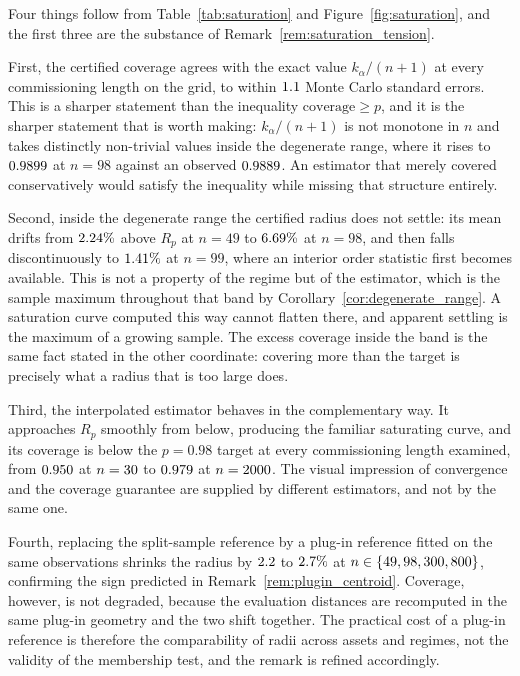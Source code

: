\documentclass[a4paper]{cas-sc}
\begin{document}
Four things follow from Table~\ref{tab:saturation} and
Figure~\ref{fig:saturation}, and the first three are the substance of
Remark~\ref{rem:saturation_tension}.

First, the certified coverage agrees with the exact value
\(k_\alpha/(n+1)\) at every commissioning length on the grid, to within
\(1.1\) Monte Carlo standard errors. This is a sharper statement than the
inequality \(\text{coverage}\ge p\), and it is the sharper statement that is
worth making: \(k_\alpha/(n+1)\) is not monotone in \(n\) and takes distinctly
non-trivial values inside the degenerate range, where it rises to
\(0.9899\) at \(n=98\) against an observed \(0.9889\). An
estimator that merely covered conservatively would satisfy the inequality
while missing that structure entirely.

Second, inside the degenerate range the certified radius does not settle: its
mean drifts from \(2.24\%\) above \(R_p\) at \(n=49\) to
\(6.69\%\) at \(n=98\), and then falls discontinuously to
\(1.41\%\) at \(n=99\), where an interior order statistic first
becomes available. This is not a property of the regime but of the estimator,
which is the sample maximum throughout that band by
Corollary~\ref{cor:degenerate_range}. A saturation curve computed this way
cannot flatten there, and apparent settling is the maximum of a growing
sample. The excess coverage inside the band is the same fact stated in the
other coordinate: covering more than the target is precisely what a radius
that is too large does.

Third, the interpolated estimator behaves in the complementary way. It
approaches \(R_p\) smoothly from below, producing the familiar saturating
curve, and its coverage is below the \(p=0.98\) target at every commissioning
length examined, from \(0.950\) at \(n=30\) to
\(0.979\) at \(n=2000\). The visual impression of
convergence and the coverage guarantee are supplied by different estimators,
and not by the same one.

Fourth, replacing the split-sample reference by a plug-in reference fitted on
the same observations shrinks the radius by \(2.2\) to
\(2.7\%\) at \(n\in\{49,98,300,800\}\), confirming the sign
predicted in Remark~\ref{rem:plugin_centroid}. Coverage, however, is not degraded, because
the evaluation distances are recomputed in the same plug-in geometry and the
two shift together. The practical cost of a plug-in reference is therefore the
comparability of radii across assets and regimes, not the validity of the
membership test, and the remark is refined accordingly.
\end{document}
